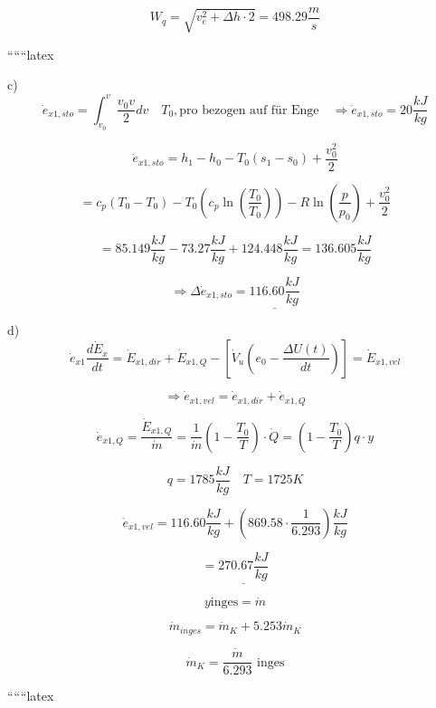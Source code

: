 \[
W_q = \sqrt{v_e^2 + \Delta h \cdot 2} = 498.29 \frac{m}{s}
\]

``````latex


c) 
\[
\dot{e}_{x1,sto} = \int_{v_0}^{v} \frac{v_0 v}{2} dv \quad T_0, \text{pro bezogen auf für Enge} \quad \Rightarrow \dot{e}_{x1,sto} = 20 \frac{kJ}{kg}
\]

\[
\dot{e}_{x1,sto} = h_1 - h_0 - T_0 (s_1 - s_0) + \frac{v_0^2}{2}
\]

\[
= c_p (T_0 - T_0) - T_0 \left( c_p \ln \left( \frac{T_0}{T_0} \right) \right) - R \ln \left( \frac{p}{p_0} \right) + \frac{v_0^2}{2}
\]

\[
= 85.149 \frac{kJ}{kg} - 73.27 \frac{kJ}{kg} + 124.448 \frac{kJ}{kg} = 136.605 \frac{kJ}{kg}
\]

\[
\Rightarrow \Delta \dot{e}_{x1,sto} = \underline{116.60 \frac{kJ}{kg}}
\]

d) 
\[
\dot{e}_{x1} \frac{d \dot{E}_x}{dt} = \dot{E}_{x1,dir} + \dot{E}_{x1,Q} - \left[ \dot{V}_u \left( e_0 - \frac{\Delta U(t)}{dt} \right) \right] = \dot{E}_{x1,vel}
\]

\[
\Rightarrow \dot{e}_{x1,vel} = \dot{e}_{x1,dir} + \dot{e}_{x1,Q}
\]

\[
\dot{e}_{x1,Q} = \frac{\dot{E}_{x1,Q}}{\dot{m}} = \frac{1}{\dot{m}} \left( 1 - \frac{T_0}{T} \right) \cdot \dot{Q} = \left( 1 - \frac{T_0}{T} \right) q \cdot y
\]

\[
q = 1785 \frac{kJ}{kg} \quad T = 1725 K
\]

\[
\dot{e}_{x1,vel} = 116.60 \frac{kJ}{kg} + \left( 869.58 \cdot \frac{1}{6.293} \right) \frac{kJ}{kg}
\]

\[
= \underline{270.67 \frac{kJ}{kg}}
\]

\[
y \text{inges} = \dot{m}
\]

\[
\dot{m}_{inges} = \dot{m}_K + 5.253 \dot{m}_K
\]

\[
\dot{m}_K = \frac{\dot{m}}{6.293} \text{ inges}
\]

``````latex


